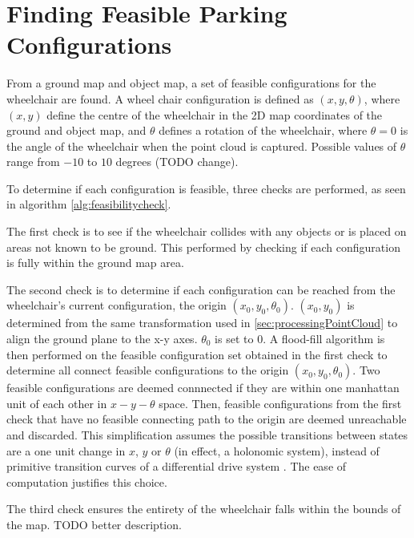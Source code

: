 \section{Finding Feasible Parking Configurations}
\label{sec:feasibleparkingspot}
From a ground map and object map, a set of feasible configurations for the
wheelchair are found. A wheel chair configuration is defined as $(x,y,\theta)$,
where $(x,y)$ define the centre of the wheelchair in the 2D map coordinates of
the ground and object map, and $\theta$ defines a rotation of the wheelchair,
where $\theta = 0$ is the angle of the wheelchair when the point cloud is
captured. Possible values of $\theta$ range from $-10$ to $10$ degrees (TODO
change).

To determine if each configuration is feasible, three checks are performed, as
seen in algorithm \autoref{alg:feasibilitycheck}. 

The first check is to see if the wheelchair
collides with any objects or is placed on areas not known to be ground. This
performed by checking if each configuration is fully within the ground map area.

The second check is to determine if each configuration can be reached from the
wheelchair's current configuration, the origin $(x_0,y_0,\theta_0)$. $(x_0,y_0)$
is determined from the same transformation used in
\autoref{sec:processingPointCloud} to align the ground plane to the x-y axes.
$\theta_0$ is set to $0$. A flood-fill algorithm is then performed on the
feasible configuration set obtained in the first check to determine all connect
feasible configurations to the origin $(x_0,y_0,\theta_0)$. Two feasible
configurations are deemed connnected if they are within one manhattan unit of
each other in $x-y-\theta$ space.
Then, feasible configurations from the first check that have no feasible
connecting path to the origin are deemed unreachable and discarded. 
This simplification assumes the possible transitions between states are a one
unit change in $x$, $y$ or $\theta$ (in effect, a holonomic system), instead of
primitive transition curves of a differential drive system
\cite{balkcom2002time}. The ease of computation justifies this choice.


The third check ensures the entirety of the wheelchair falls within the bounds
of the map. TODO better description.

